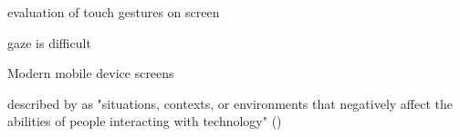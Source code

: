 \cite{williamson2011multimodal} evaluation of touch gestures on screen


\cite{mackenzie2010eye} gaze is difficult













\cite{xuesheng2018research} Modern mobile device screens 


described by \citeauthor{yesiladaweb} as "situations, contexts, or environments that negatively affect the abilities of people interacting with technology" (\citeyear{yesiladaweb})\\

